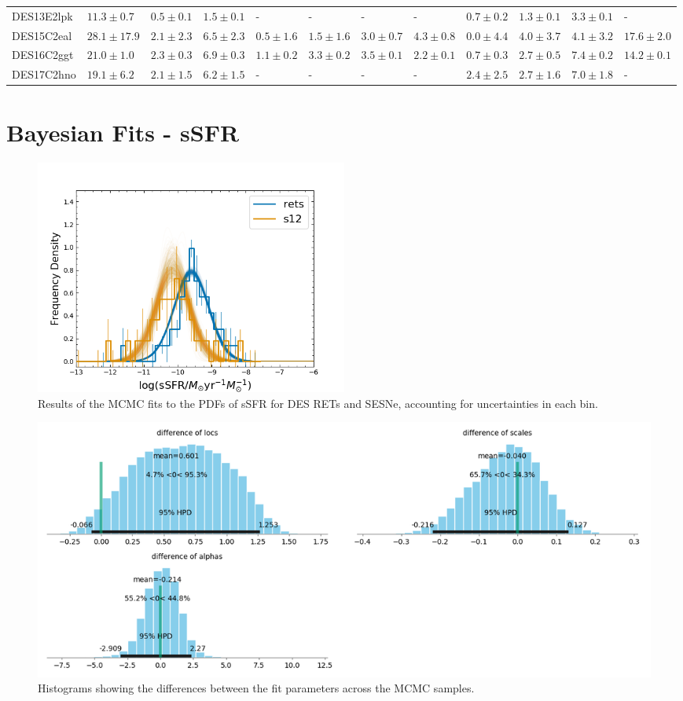 \documentclass[fleqn,usenatbib,]{mnras}
\begin{document}
\begin{table}
\begin{tabular}{llllllllllll}
DES13E2lpk &   $11.3 \pm 0.7$ &    $0.5 \pm 0.1$ &     $1.5 \pm 0.1$ &               - &               - &               - &               - &   $0.7 \pm 0.2$ &    $1.3 \pm 0.1$ &    $3.3 \pm 0.1$ &                - \\
DES15C2eal &  $28.1 \pm 17.9$ &    $2.1 \pm 2.3$ &     $6.5 \pm 2.3$ &   $0.5 \pm 1.6$ &   $1.5 \pm 1.6$ &   $3.0 \pm 0.7$ &   $4.3 \pm 0.8$ &   $0.0 \pm 4.4$ &    $4.0 \pm 3.7$ &    $4.1 \pm 3.2$ &   $17.6 \pm 2.0$ \\
DES16C2ggt &   $21.0 \pm 1.0$ &    $2.3 \pm 0.3$ &     $6.9 \pm 0.3$ &   $1.1 \pm 0.2$ &   $3.3 \pm 0.2$ &   $3.5 \pm 0.1$ &   $2.2 \pm 0.1$ &   $0.7 \pm 0.3$ &    $2.7 \pm 0.5$ &    $7.4 \pm 0.2$ &   $14.2 \pm 0.1$ \\
DES17C2hno &   $19.1 \pm 6.2$ &    $2.1 \pm 1.5$ &     $6.2 \pm 1.5$ &               - &               - &               - &               - &   $2.4 \pm 2.5$ &    $2.7 \pm 1.6$ &    $7.0 \pm 1.8$ &                - \\
\bottomrule
\end{tabular}
\end{table}

\newpage
\section{Bayesian Fits - sSFR}
\label{app:b}

\begin{figure}
\includegraphics[width=0.5\textwidth]{mc_figs/rets_s12_histfit_ssfr_final.png}
\caption{Results of the MCMC fits to the PDFs of sSFR for DES RETs and SESNe, accounting for uncertainties in each bin.
\label{fig:histfit_s12_ssfr}}
\end{figure}

\begin{figure}
\includegraphics[width=\textwidth]{mc_figs/rets_s12_param_diffs_ssfr_final.png}
\caption{Histograms showing the differences between the fit parameters across the MCMC samples.
\label{fig:param_diffs}}
\end{figure}
\end{document}

